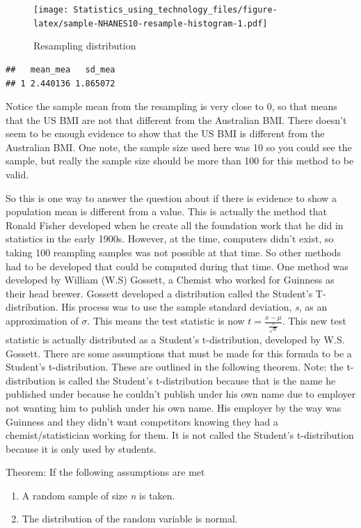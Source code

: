 \documentclass[]{book}
\begin{document}
\begin{figure}
\centering
\texttt{[image: Statistics\_using\_technology\_files/figure-latex/sample-NHANES10-resample-histogram-1.pdf]}
\caption{\label{fig:sample-NHANES10-resample-histogram}Resampling distribution}
\end{figure}

\begin{verbatim}
##   mean_mea   sd_mea
## 1 2.440136 1.865072
\end{verbatim}

Notice the sample mean from the resampling is very close to 0, so that means that the US BMI are not that different from the Australian BMI. There doesn't seem to be enough evidence to show that the US BMI is different from the Australian BMI. One note, the sample size used here was 10 so you could see the sample, but really the sample size should be more than 100 for this method to be valid.

So this is one way to answer the question about if there is evidence to show a population mean is different from a value. This is actually the method that Ronald Fisher developed when he create all the foundation work that he did in statistics in the early 1900s. However, at the time, computers didn't exist, so taking 100 reampling samples was not possible at that time. So other methods had to be developed that could be computed during that time. One method was developed by William (W.S) Gossett, a Chemist who worked for Guinness as their head brewer. Gossett developed a distribution called the Student's T-distribution. His process was to use the sample standard deviation, \emph{s}, as an approximation of \(\sigma\). This means the test statistic is now \(t=\frac{x-\mu}{\frac{s}{\sqrt{n}}}\). This new test statistic is actually distributed as a Student's t-distribution, developed by W.S. Gossett. There are some assumptions that must be made for this formula to be a Student's t-distribution. These are outlined in the following theorem. Note: the t-distribution is called the Student's t-distribution because that is the name he published under because he couldn't publish under his own name due to employer not wanting him to publish under his own name. His employer by the way was Guinness and they didn't want competitors knowing they had a chemist/statistician working for them. It is not called the Student's t-distribution because it is only used by students.

Theorem: If the following assumptions are met

\begin{enumerate}
\def\labelenumi{\alph{enumi}.}
\item
  A random sample of size \emph{n} is taken.
\item
  The distribution of the random variable is normal.
\end{enumerate}
\end{document}
